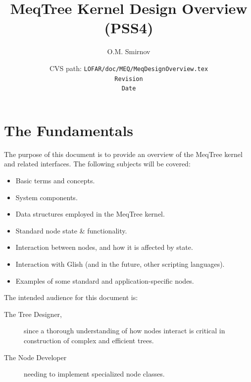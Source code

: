 \documentclass[10pt,twoside]{book}
\title{{\sf MeqTree Kernel Design Overview (PSS4)}}
\author{{\sf O.M. Smirnov}}
\date{\vspace{2cm}\small CVS path: \tt LOFAR/doc/MEQ/MeqDesignOverview.tex\\\rm
$ $Revision$ $\\$ $Date$ $}
\begin{document}
\sloppy

\newcommand{\url}[1]{{\tt #1}}

\maketitle
\tableofcontents

\newcommand{\qq}[1]{{\tt #1}}

\newcommand{\Request}{{\tt Request}}
\newcommand{\RequestId}{{\tt RequestId}}
\newcommand{\Result}{{\tt Result}}
\newcommand{\VellSet}{{\tt VellSet}}
\newcommand{\Cells}{{\tt Cells}}
\newcommand{\Vells}{{\tt Vells}}
\newcommand{\Domain}{{\tt Domain}}
\newcommand{\Node}{{\tt Node}}
\newcommand{\Parm}{{\tt Parm}}
\newcommand{\Polc}{{\tt Polc}}
\newcommand{\RES}[1]{{\tt RES\_#1}}

\chapter{The Fundamentals}

  The purpose of this document is to provide an overview of the MeqTree kernel
  and related interfaces. The following subjects will be covered:

  \begin{itemize}

  \item Basic terms and concepts.

  \item System components.

  \item Data structures employed in the MeqTree kernel.

  \item Standard node state \& functionality.

  \item Interaction between nodes, and how it is affected by state.

  \item Interaction with Glish (and in the future, other scripting languages).

  \item Examples of some standard and application-specific nodes.

  \end{itemize}

  The intended audience for this document is:

  \begin{description}

  \item[The Tree Designer,] since a thorough understanding of how nodes interact
  is critical in construction of complex and efficient trees.

  \item[The Node Developer] needing to implement specialized node classes.

  \end{description}
\end{document}
